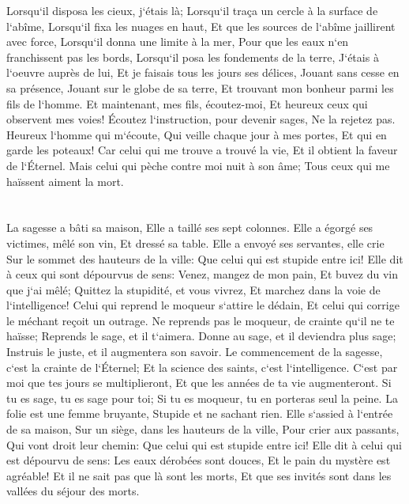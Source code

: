 \verse Lorsqu`il disposa les cieux, j`étais là; Lorsqu`il traça un cercle à la surface de l`abîme, 
\verse Lorsqu`il fixa les nuages en haut, Et que les sources de l`abîme jaillirent avec force, 
\verse Lorsqu`il donna une limite à la mer, Pour que les eaux n`en franchissent pas les bords, Lorsqu`il posa les fondements de la terre, 
\verse J`étais à l`oeuvre auprès de lui, Et je faisais tous les jours ses délices, Jouant sans cesse en sa présence, 
\verse Jouant sur le globe de sa terre, Et trouvant mon bonheur parmi les fils de l`homme. 
\verse Et maintenant, mes fils, écoutez-moi, Et heureux ceux qui observent mes voies! 
\verse Écoutez l`instruction, pour devenir sages, Ne la rejetez pas. 
\verse Heureux l`homme qui m`écoute, Qui veille chaque jour à mes portes, Et qui en garde les poteaux! 
\verse Car celui qui me trouve a trouvé la vie, Et il obtient la faveur de l`Éternel. 
\verse Mais celui qui pèche contre moi nuit à son âme; Tous ceux qui me haïssent aiment la mort. 

\chapter{}

\verse La sagesse a bâti sa maison, Elle a taillé ses sept colonnes. 
\verse Elle a égorgé ses victimes, mêlé son vin, Et dressé sa table. 
\verse Elle a envoyé ses servantes, elle crie Sur le sommet des hauteurs de la ville: 
\verse Que celui qui est stupide entre ici! Elle dit à ceux qui sont dépourvus de sens: 
\verse Venez, mangez de mon pain, Et buvez du vin que j`ai mêlé; 
\verse Quittez la stupidité, et vous vivrez, Et marchez dans la voie de l`intelligence! 
\verse Celui qui reprend le moqueur s`attire le dédain, Et celui qui corrige le méchant reçoit un outrage. 
\verse Ne reprends pas le moqueur, de crainte qu`il ne te haïsse; Reprends le sage, et il t`aimera. 
\verse Donne au sage, et il deviendra plus sage; Instruis le juste, et il augmentera son savoir. 
\verse Le commencement de la sagesse, c`est la crainte de l`Éternel; Et la science des saints, c`est l`intelligence. 
\verse C`est par moi que tes jours se multiplieront, Et que les années de ta vie augmenteront. 
\verse Si tu es sage, tu es sage pour toi; Si tu es moqueur, tu en porteras seul la peine. 
\verse La folie est une femme bruyante, Stupide et ne sachant rien. 
\verse Elle s`assied à l`entrée de sa maison, Sur un siège, dans les hauteurs de la ville, 
\verse Pour crier aux passants, Qui vont droit leur chemin: 
\verse Que celui qui est stupide entre ici! Elle dit à celui qui est dépourvu de sens: 
\verse Les eaux dérobées sont douces, Et le pain du mystère est agréable! 
\verse Et il ne sait pas que là sont les morts, Et que ses invités sont dans les vallées du séjour des morts. 

